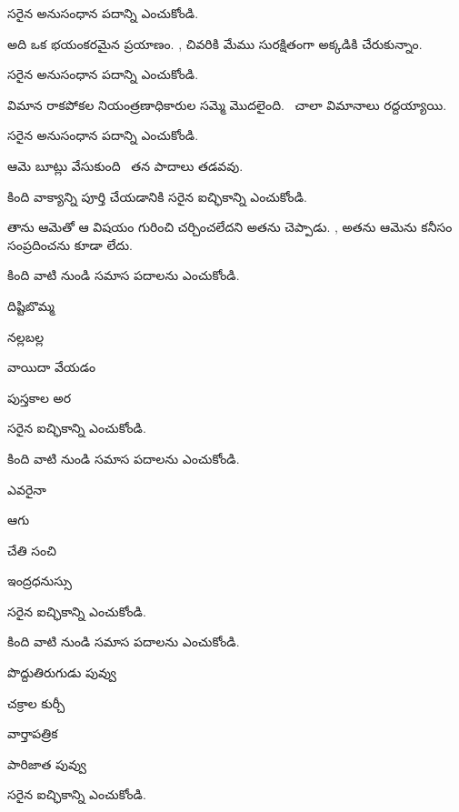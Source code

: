 \begin{questions}
 సరైన అనుసంధాన పదాన్ని  ఎంచుకోండి.\par
అది ఒక భయంకరమైన ప్రయాణం. \blank, చివరికి మేము సురక్షితంగా అక్కడికి చేరుకున్నాం.

 సరైన అనుసంధాన పదాన్ని  ఎంచుకోండి.\par
విమాన రాకపోకల నియంత్రణాధికారుల సమ్మె మొదలైంది. \blank\ చాలా విమానాలు రద్దయ్యాయి.

 సరైన అనుసంధాన పదాన్ని  ఎంచుకోండి.\par
ఆమె బూట్లు వేసుకుంది \blank\ తన పాదాలు తడవవు.

 కింది వాక్యాన్ని పూర్తి చేయడానికి సరైన ఐచ్ఛికాన్ని ఎంచుకోండి.\par
తాను ఆమెతో ఆ విషయం గురించి చర్చించలేదని అతను చెప్పాడు. \blank, అతను ఆమెను కనీసం సంప్రదించను కూడా లేదు.

 కింది వాటి నుండి సమాస పదాలను  ఎంచుకోండి.\par
{} దిష్టిబొమ్మ \par
{} నల్లబల్ల \par
{} వాయిదా వేయడం \par
{} పుస్తకాల అర \par
సరైన ఐచ్ఛికాన్ని ఎంచుకోండి.

 కింది వాటి నుండి సమాస పదాలను  ఎంచుకోండి.\par
{} ఎవరైనా \par
{} ఆగు \par
{} చేతి సంచి \par
{} ఇంద్రధనుస్సు \par
సరైన ఐచ్ఛికాన్ని ఎంచుకోండి.

 కింది వాటి నుండి సమాస పదాలను  ఎంచుకోండి.\par
{} పొద్దుతిరుగుడు పువ్వు \par
{} చక్రాల కుర్చీ \par
{} వార్తాపత్రిక \par
{} పారిజాత పువ్వు \par
సరైన ఐచ్ఛికాన్ని ఎంచుకోండి.


\end{questions}
